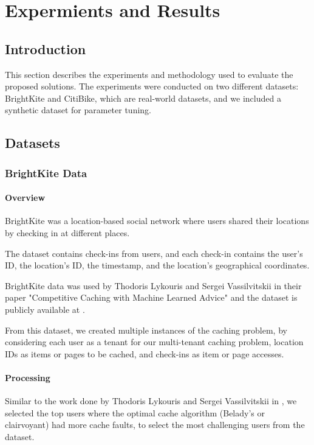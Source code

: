\chapter{Expermients and Results}

\section{Introduction}

This section describes the experiments and methodology used to evaluate the proposed solutions. 
The experiments were conducted on two different datasets: BrightKite and CitiBike, which are 
real-world datasets, and we included a synthetic dataset for parameter tuning.

\section{Datasets}

\subsection{BrightKite Data}

\subsubsection{Overview}

BrightKite was a location-based social network where users shared their locations by checking in at 
different places.

The dataset contains check-ins from users, and each check-in contains the user's ID, the location's ID, 
the timestamp, and the location's geographical coordinates.

BrightKite data was used by Thodoris Lykouris and Sergei Vassilvitskii in their paper "Competitive 
Caching with Machine Learned Advice" \cite{datasets-reference} and the dataset is publicly available
at \cite{brightkite-data}.

From this dataset, we created multiple instances of the caching problem, by considering each user 
as a tenant for our multi-tenant caching problem, location IDs as items or pages to be cached, and 
check-ins as item or page accesses. 

\subsubsection{Processing}

Similar to the work done by Thodoris Lykouris and Sergei Vassilvitskii in \cite{datasets-reference},
we selected the top users where the optimal cache algorithm (Belady's or clairvoyant) had more cache 
faults, to select the most challenging users from the dataset.

